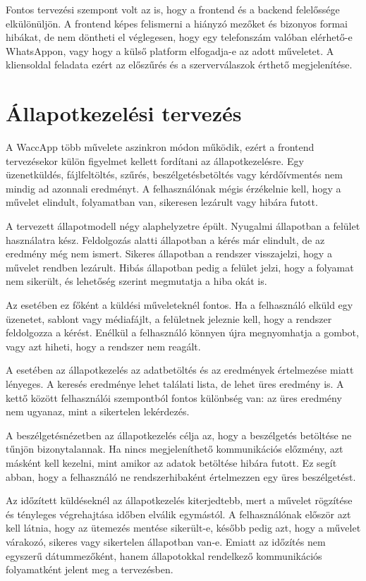 Fontos tervezési szempont volt az is, hogy a frontend és a backend felelőssége elkülönüljön. A frontend képes felismerni a hiányzó mezőket és bizonyos formai hibákat, de nem döntheti el véglegesen, hogy egy telefonszám valóban elérhető-e WhatsAppon, vagy hogy a külső platform elfogadja-e az adott műveletet. A kliensoldal feladata ezért az előszűrés és a szerverválaszok érthető megjelenítése.

\section{Állapotkezelési tervezés}

A WaccApp több művelete aszinkron módon működik, ezért a frontend tervezésekor külön figyelmet kellett fordítani az állapotkezelésre. Egy üzenetküldés, fájlfeltöltés, szűrés, beszélgetésbetöltés vagy kérdőívmentés nem mindig ad azonnali eredményt. A felhasználónak mégis érzékelnie kell, hogy a művelet elindult, folyamatban van, sikeresen lezárult vagy hibára futott.

A tervezett állapotmodell négy alaphelyzetre épült. Nyugalmi állapotban a felület használatra kész. Feldolgozás alatti állapotban a kérés már elindult, de az eredmény még nem ismert. Sikeres állapotban a rendszer visszajelzi, hogy a művelet rendben lezárult. Hibás állapotban pedig a felület jelzi, hogy a folyamat nem sikerült, és lehetőség szerint megmutatja a hiba okát is.

Az  esetében ez főként a küldési műveleteknél fontos. Ha a felhasználó elküld egy üzenetet, sablont vagy médiafájlt, a felületnek jeleznie kell, hogy a rendszer feldolgozza a kérést. Enélkül a felhasználó könnyen újra megnyomhatja a gombot, vagy azt hiheti, hogy a rendszer nem reagált.

A  esetében az állapotkezelés az adatbetöltés és az eredmények értelmezése miatt lényeges. A keresés eredménye lehet találati lista, de lehet üres eredmény is. A kettő között felhasználói szempontból fontos különbség van: az üres eredmény nem ugyanaz, mint a sikertelen lekérdezés.

A  beszélgetésnézetben az állapotkezelés célja az, hogy a beszélgetés betöltése ne tűnjön bizonytalannak. Ha nincs megjeleníthető kommunikációs előzmény, azt másként kell kezelni, mint amikor az adatok betöltése hibára futott. Ez segít abban, hogy a felhasználó ne rendszerhibaként értelmezzen egy üres beszélgetést.

Az időzített küldéseknél az állapotkezelés kiterjedtebb, mert a művelet rögzítése és tényleges végrehajtása időben elválik egymástól. A felhasználónak először azt kell látnia, hogy az ütemezés mentése sikerült-e, később pedig azt, hogy a művelet várakozó, sikeres vagy sikertelen állapotban van-e. Emiatt az időzítés nem egyszerű dátummezőként, hanem állapotokkal rendelkező kommunikációs folyamatként jelent meg a tervezésben.

